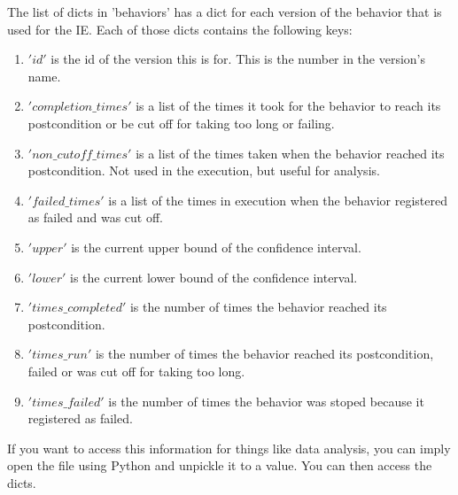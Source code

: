 \documentclass[a4paper, 12pt, oneside]{report}
\begin{document}

The list of dicts in 'behaviors' has a dict for each version of the behavior that is used for the IE.
Each of those dicts contains the following keys:

\begin{enumerate}
\item{$'id'$} is the id of the version this is for. This is the number in the version's name.
\item{$'completion\_times'$} is a list of the times it took for the behavior to reach its postcondition or be cut off for taking too long or failing.
\item{$'non\_cutoff\_times'$} is a list of the times taken when the behavior reached its postcondition. Not used in the execution, but useful for analysis.
\item{$'failed\_times'$} is a list of the times in execution when the behavior registered as failed and was cut off.
\item{$'upper'$} is the current upper bound of the confidence interval.
\item{$'lower'$} is the current lower bound of the confidence interval.
\item{$'times\_completed'$} is the number of times the behavior reached its postcondition.
\item{$'times\_run'$} is the number of times the behavior reached its postcondition, failed or was cut off for taking too long.
\item{$'times\_failed'$} is the number of times the behavior was stoped because it registered as failed.
\end{enumerate}

If you want to access this information for things like data analysis, you can imply open the file using Python and unpickle it to a value.
You can then access the dicts.
\end{document}
